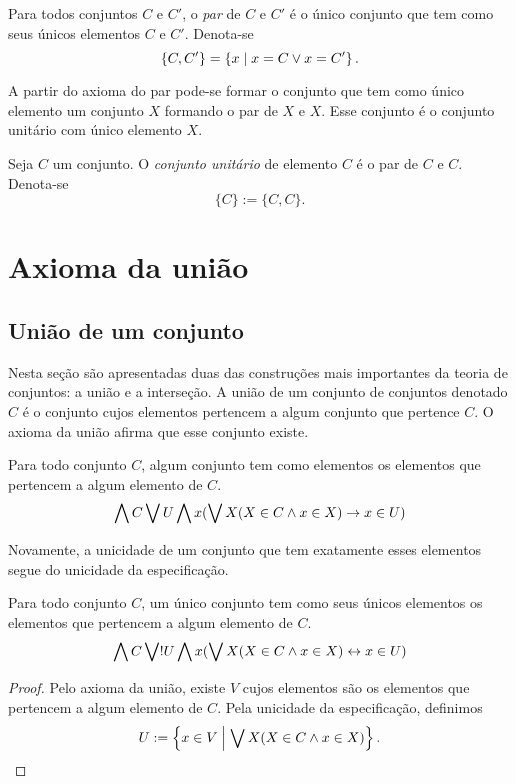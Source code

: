 \begin{definition}
Para todos conjuntos $C$ e $C'$, o \emph{par} de $C$ e $C'$ é o único conjunto que tem como seus únicos elementos $C$ e $C'$. Denota-se
	\begin{equation*}
	\{C,C'\} = \left\{{x}\;\middle\vert\;{x=C \lor x=C'}\right\}.
	\end{equation*}
\end{definition}

A partir do axioma do par pode-se formar o conjunto que tem como único elemento um conjunto $X$ formando o par de $X$ e $X$. Esse conjunto é o conjunto unitário com único elemento $X$.

\begin{definition}
Seja $C$ um conjunto. O \emph{conjunto unitário} de elemento $C$ é o par de $C$ e $C$. Denota-se
	\begin{equation*}
	\{C\} := \{C,C\}.
	\end{equation*}
\end{definition}

\section{Axioma da união}

\subsection{União de um conjunto}

Nesta seção são apresentadas duas das construções mais importantes da teoria de conjuntos: a união e a interseção. A união de um conjunto de conjuntos denotado $C$ é o conjunto cujos elementos pertencem a algum conjunto que pertence $C$. O axioma da união afirma que esse conjunto existe.

\begin{axiom}[União]
Para todo conjunto $C$, algum conjunto tem como elementos os elementos que pertencem a algum elemento de $C$.
	\begin{equation*}
	\bigwedge\nolimits C \bigvee\nolimits U \bigwedge\nolimits x(\bigvee\nolimits X(X \in C \land x \in X) \rightarrow x \in U)
	\end{equation*}
\end{axiom}

Novamente, a unicidade de um conjunto que tem exatamente esses elementos segue do unicidade da especificação.

\begin{proposition}
Para todo conjunto $C$, um único conjunto tem como seus únicos elementos os elementos que pertencem a algum elemento de $C$.
	\begin{equation*}
	\bigwedge\nolimits C \bigvee\nolimits! U \bigwedge\nolimits x(\bigvee\nolimits X(X \in C \land x \in X) \leftrightarrow x \in U)
	\end{equation*}
\end{proposition}
\begin{proof}
Pelo axioma da união, existe $V$ cujos elementos são os elementos que pertencem a algum elemento de $C$. Pela unicidade da especificação, definimos
	\begin{equation*}
	U := \left\{{x \in V}\;\middle\vert\;{\bigvee\nolimits X(X \in C \land x \in X)}\right\}. \qedhere
	\end{equation*}
\end{proof}

